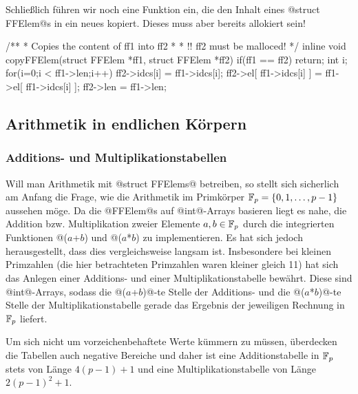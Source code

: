 Schließlich führen wir noch eine Funktion ein, die den Inhalt eines
@struct FFElem@s in ein neues kopiert. Dieses muss aber bereits allokiert sein!


\begin{ccode}[caption={Aus \url{../Sage/enumeratePCNs.c}},
  firstnumber=50]
/**
 * Copies the content of ff1 into ff2
 *
 * !! ff2 must be malloced!
 */
inline void copyFFElem(struct FFElem *ff1, struct FFElem *ff2){
    if(ff1 == ff2) return;
    int i;
    for(i=0;i < ff1->len;i++){
        ff2->idcs[i] = ff1->idcs[i];
        ff2->el[ ff1->idcs[i] ] = ff1->el[ ff1->idcs[i] ];
    }
    ff2->len = ff1->len;
}
\end{ccode}

\subsection{Arithmetik in endlichen Körpern}
\label{sub:arithmetik_in_endlichen_körpern}


\subsubsection{Additions- und Multiplikationstabellen}
Will man Arithmetik mit @struct FFElems@ betreiben, so stellt sich sicherlich
am Anfang die Frage, wie die Arithmetik im Primkörper 
$\mathbb{F}_p = \{0,1,\ldots,p-1\}$
aussehen möge. Da
die @FFElem@s auf @int@-Arrays basieren liegt es nahe, die Addition bzw.
Multiplikation zweier Elemente $a,b\in \mathbb{F}_p$ durch die integrierten Funktionen
@($a$+$b$) %
und @($a$*$b$) %
zu implementieren. Es hat sich jedoch herausgestellt, dass dies vergleichsweise
langsam ist. Insbesondere bei kleinen Primzahlen 
(die hier betrachteten Primzahlen waren kleiner gleich 11) 
hat sich das Anlegen einer
Additions- und einer Multiplikationstabelle bewährt. Diese sind @int@-Arrays,
sodass die @($a$+$b$)@-te Stelle der Additions- und die 
@($a$*$b$)@-te Stelle der Multiplikationstabelle gerade das Ergebnis der
jeweiligen Rechnung in $\mathbb{F}_p$ liefert.

\begin{bemerkung}
  Um sich nicht um vorzeichenbehaftete Werte kümmern zu müssen, überdecken die
  Tabellen auch negative Bereiche und daher ist eine Additionstabelle in $\mathbb{F}_p$
  stets von Länge $4(p-1)+1$ und eine Multiplikationstabelle von
  Länge $2(p-1)^2+1$.
\end{bemerkung}

